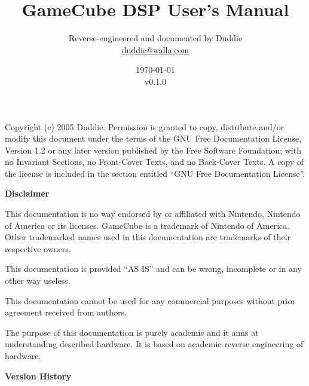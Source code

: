 \documentclass[oneside,english,a4paper,10pt,oneside,openany,final]{memoir}
\title{\textbf{\Huge GameCube DSP User's Manual}}
\author{Reverse-engineered and documented by Duddie \\ \href{mailto:duddie@walla.com}{duddie@walla.com}}
\date{\today\\v0.1.0}
\begin{document}
\maketitle{}

\pagebreak{}
\vspace*{\fill}

Copyright (c) 2005 Duddie. Permission is granted to copy, distribute and/or modify this document under the terms of the GNU Free Documentation License, Version 1.2 or any later version published by the Free Software Foundation; with no Invariant Sections, no Front-Cover Texts, and no Back-Cover Texts. A copy of the license is included in the section entitled ``GNU Free Documentation License''.

\pagebreak{}
\tableofcontents{}
\pagebreak{}

\textbf{\LARGE Disclaimer}
\vspace{5mm}

This documentation is no way endorsed by or affiliated with Nintendo, Nintendo of America or its licenses. GameCube is a trademark of Nintendo of America. Other trademarked names used in this documentation are trademarks of their respective owners.

This documentation is provided ``AS IS'' and can be wrong, incomplete or in any other way useless.

This documentation cannot be used for any commercial purposes without prior agreement received from authors.

The purpose of this documentation is purely academic and it aims at understanding described hardware. It is based on academic reverse engineering of hardware.

\pagebreak{}
\textbf{\LARGE Version History}
\vspace{5mm}
\end{document}
